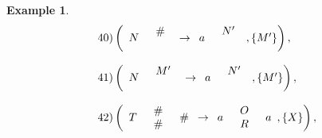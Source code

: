 \documentclass[11pt]{article}
\newtheorem{example}[theorem]{Example}
\begin{document}
\begin{example}
\[\begin{array}{l}
 40)\left( {\begin{array}{*{20}c}
   N & {\begin{array}{*{20}c}
   \#   \\
   {}  \\
\end{array}}  \\
\end{array} \to \begin{array}{*{20}c}
   a & {\begin{array}{*{20}c}
   {N'}  \\
   {}  \\
\end{array}}  \\
\end{array},\left\{ {M'} \right\}} \right), \\\\
 41)\left( {\begin{array}{*{20}c}
   N & {\begin{array}{*{20}c}
   {M'}  \\
   {}  \\
\end{array}}  \\
\end{array} \to \begin{array}{*{20}c}
   a & {\begin{array}{*{20}c}
   {N'}  \\
   {}  \\
\end{array}}  \\
\end{array},\left\{ {M'} \right\}} \right), \\\\
 42)\left( {\begin{array}{*{20}c}
   T & {\begin{array}{*{20}c}
   \#   \\
   \#   \\
\end{array}} & \#   \\
\end{array} \to \begin{array}{*{20}c}
   a & {\begin{array}{*{20}c}
   O  \\
   R  \\
\end{array}} & a  \\
\end{array},\left\{ X \right\}} \right), \\\\

\end{array}\]
\end{example}
\end{document}
